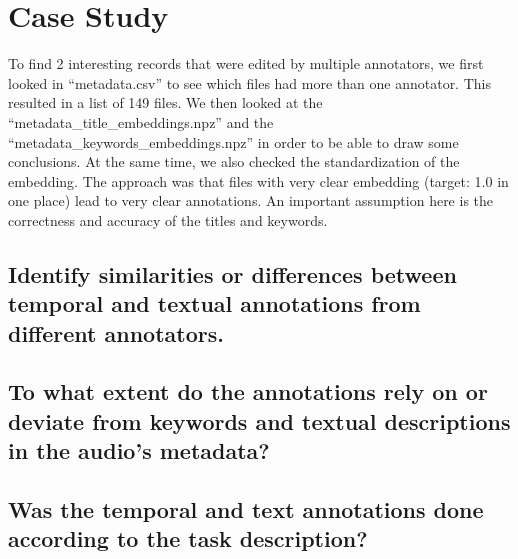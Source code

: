 
\section{Case Study}
\label{sec:Case Study}

To find 2 interesting records that were edited by multiple annotators, 
we first looked in ``metadata.csv'' to see which files had more than one annotator. 
This resulted in a list of 149 files. 
We then looked at the ``metadata_title_embeddings.npz'' and the ``metadata_keywords_embeddings.npz'' in order to be able to draw some conclusions. 
At the same time, we also checked the standardization of the embedding. 
The approach was that files with very clear embedding (target: 1.0 in one place) lead to very clear annotations. 
An important assumption here is the correctness and accuracy of the titles and keywords. 


\subsection{Identify similarities or differences between temporal and textual annotations from different annotators.}
\label{sec:Case Study:a}



\subsection{To what extent do the annotations rely on or deviate from keywords and textual descriptions in the audio’s metadata?}
\label{sec:Case Study:b}



\subsection{Was the temporal and text annotations done according to the task description?}
\label{sec:Case Study:c}




